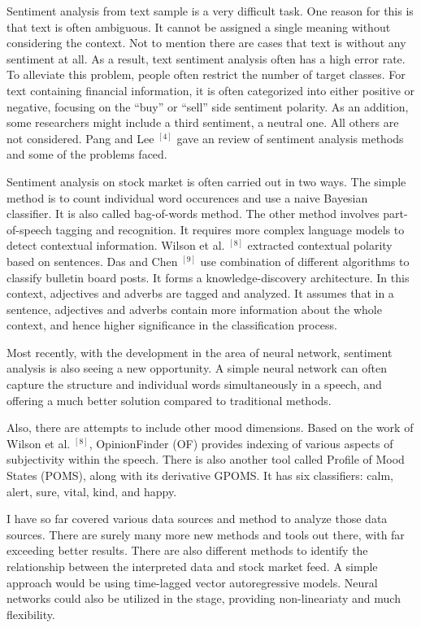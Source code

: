 Sentiment analysis from text sample is a very difficult task. One reason for this is that text is often ambiguous. It cannot be assigned a single meaning without considering the context. Not to mention there are cases that text is without any sentiment at all. As a result, text sentiment analysis often has a high error rate. To alleviate this problem, people often restrict the number of target classes. For text containing financial information, it is often categorized into either positive or negative, focusing on the ``buy'' or ``sell'' side sentiment polarity. As an addition, some researchers might include a third sentiment, a neutral one. All others are not considered. Pang and Lee $^{[4]}$ gave an review of sentiment analysis methods and some of the problems faced.

Sentiment analysis on stock market is often carried out in two ways. The simple method is to count individual word occurences and use a naive Bayesian classifier. It is also called bag-of-words method. The other method involves part-of-speech tagging and recognition. It requires more complex language models to detect contextual information. Wilson et al. $^{[8]}$ extracted contextual polarity based on sentences. Das and Chen $^{[9]}$ use combination of different algorithms to classify bulletin board posts. It forms a knowledge-discovery architecture. In this context, adjectives and adverbs are tagged and analyzed. It assumes that in a sentence, adjectives and adverbs contain more information about the whole context, and hence higher significance in the classification process.

Most recently, with the development in the area of neural network, sentiment analysis is also seeing a new opportunity. A simple neural network can often capture the structure and individual words simultaneously in a speech, and offering a much better solution compared to traditional methods.

Also, there are attempts to include other mood dimensions. Based on the work of Wilson et al. $^{[8]}$, OpinionFinder (OF) provides indexing of various aspects of subjectivity within the speech. There is also another tool called Profile of Mood States (POMS), along with its derivative GPOMS. It has six classifiers: calm, alert, sure, vital, kind, and happy.

I have so far covered various data sources and method to analyze those data sources. There are surely many more new methods and tools out there, with far exceeding better results. There are also different methods to identify the relationship between the interpreted data and stock market feed. A simple approach would be using time-lagged vector autoregressive models. Neural networks could also be utilized in the stage, providing non-lineariaty and much flexibility.

